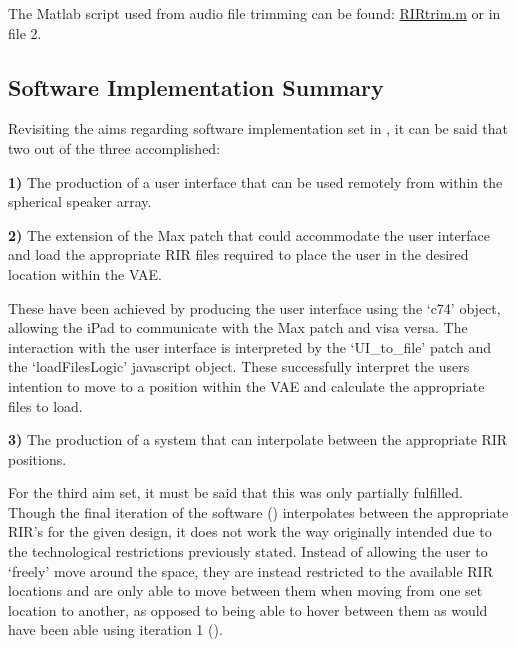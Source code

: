 \documentclass[../../main.tex]{subfiles}
\begin{document}
		The Matlab script used from audio file trimming can be found: \href{http://lt669.github.io/code/matlab/html/RIRtrim.html}{RIRtrim.m} or in file 2.


		


	\subsection{Software Implementation Summary}

		Revisiting the aims regarding software implementation set in , it can be said that two out of the three accomplished:

		\textbf{1)} The production of a user interface that can be used remotely from within the spherical speaker array. 

		\textbf{2)} The extension of the Max patch that could accommodate the user interface and load the appropriate \ac{RIR} files required to place the user in the desired location within the \ac{VAE}. 

		These have been achieved by producing the user interface using the `c74' object, allowing the iPad to communicate with the Max patch and visa versa. The interaction with the user interface is interpreted by the `UI\_to\_file' patch and the `loadFilesLogic' javascript object. These successfully interpret the users intention to move to a position within the \ac{VAE} and calculate the appropriate files to load.
 
 		\textbf{3)} The production of a system that can interpolate between the appropriate \ac{RIR} positions.

 		For the third aim set, it must be said that this was only partially fulfilled. Though the final iteration of the software () interpolates between the appropriate \ac{RIR}'s for the given design, it does not work the way originally intended due to the technological restrictions previously stated. Instead of allowing the user to `freely' move around the space, they are instead restricted to the available \ac{RIR} locations and are only able to move between them when moving from one set location to another, as opposed to being able to hover between them as would have been able using iteration 1 ().
\end{document}

